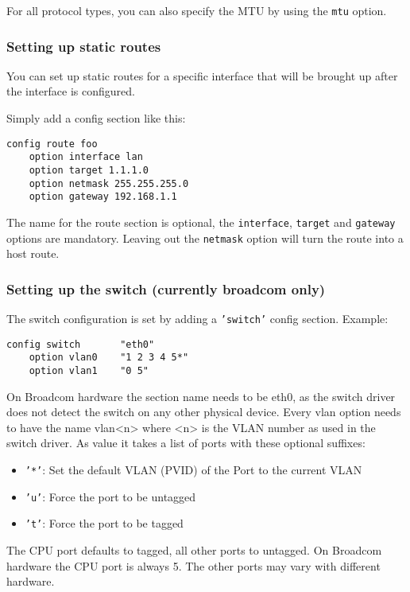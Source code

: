 For all protocol types, you can also specify the MTU by using the \texttt{mtu} option.

\subsubsection{Setting up static routes}

You can set up static routes for a specific interface that will be brought up 
after the interface is configured.

Simply add a config section like this:

\begin{Verbatim}
config route foo
	option interface lan
	option target 1.1.1.0
	option netmask 255.255.255.0
	option gateway 192.168.1.1
\end{Verbatim}

The name for the route section is optional, the \texttt{interface}, \texttt{target} and 
\texttt{gateway} options are mandatory.
Leaving out the \texttt{netmask} option will turn the route into a host route.

\subsubsection{Setting up the switch (currently broadcom only)}

The switch configuration is set by adding a \texttt{'switch'} config section.
Example:

\begin{Verbatim}
config switch       "eth0"
    option vlan0    "1 2 3 4 5*"
    option vlan1    "0 5"
\end{Verbatim}

On Broadcom hardware the section name needs to be eth0, as the switch driver
does not detect the switch on any other physical device.
Every vlan option needs to have the name vlan<n> where <n> is the VLAN number
as used in the switch driver.
As value it takes a list of ports with these optional suffixes:

\begin{itemize}
    \item{\texttt{'*'}:}
        Set the default VLAN (PVID) of the Port to the current VLAN
    \item{\texttt{'u'}:}
        Force the port to be untagged
    \item{\texttt{'t'}:}
        Force the port to be tagged
\end{itemize}

The CPU port defaults to tagged, all other ports to untagged.
On Broadcom hardware the CPU port is always 5. The other ports may vary with
different hardware.


